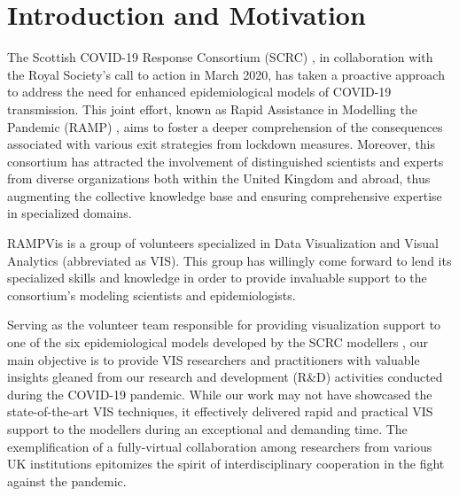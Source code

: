\section{Introduction and Motivation}
\label{sec:intro}

The Scottish COVID-19 Response Consortium (SCRC) \cite{2020University}, in collaboration with the Royal Society's call to action in March 2020, has taken a proactive approach to address the need for enhanced epidemiological models of COVID-19 transmission.
This joint effort, known as Rapid Assistance in Modelling the Pandemic (RAMP) \cite{2020Rapid}, aims to foster a deeper comprehension of the consequences associated with various exit strategies from lockdown measures.
Moreover, this consortium has attracted the involvement of distinguished scientists and experts from diverse organizations both within the United Kingdom and abroad, thus augmenting the collective knowledge base and ensuring comprehensive expertise in specialized domains.

RAMPVis \cite{2020Visualization} is a group of volunteers specialized in Data Visualization and Visual Analytics (abbreviated as VIS).
This group has willingly come forward to lend its specialized skills and knowledge in order to provide invaluable support to the consortium's modeling scientists and epidemiologists.

Serving as the volunteer team responsible for providing visualization support to one of the six epidemiological models developed by the SCRC modellers \cite{chen2022RAMPVIS}, our main objective is to provide VIS researchers and practitioners with valuable insights gleaned from our research and development (R\&D) activities conducted during the COVID-19 pandemic.
While our work may not have showcased the state-of-the-art VIS techniques, it effectively delivered rapid and practical VIS support to the modellers during an exceptional and demanding time.
The exemplification of a fully-virtual collaboration among researchers from various UK institutions epitomizes the spirit of interdisciplinary cooperation in the fight against the pandemic.


